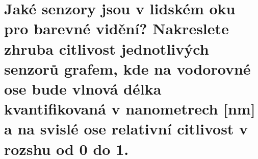 \section{Jaké senzory jsou v lidském oku pro barevné vidění? Nakreslete zhruba citlivost jednotlivých senzorů grafem, 
kde na vodorovné ose bude vlnová délka kvantifikovaná v nanometrech [nm] a na svislé ose relativní citlivost v rozshu od 
0 do 1.}